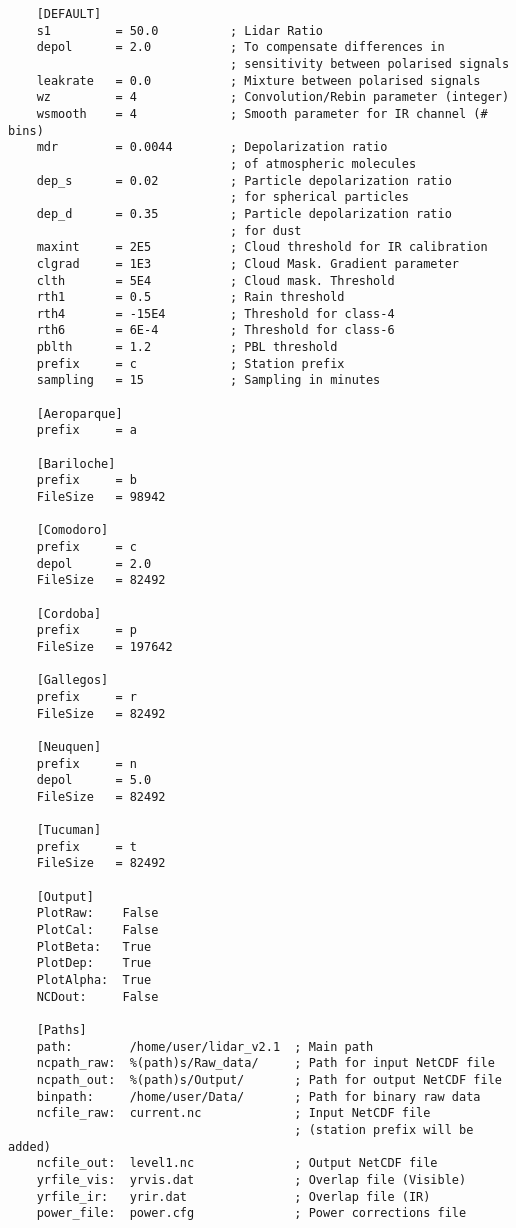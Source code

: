 \documentclass[12pt,a4paper,final]{report}
\begin{document}
    \begin{verbatim}
    [DEFAULT]
    s1         = 50.0          ; Lidar Ratio
    depol      = 2.0           ; To compensate differences in 
                               ; sensitivity between polarised signals
    leakrate   = 0.0           ; Mixture between polarised signals
    wz         = 4             ; Convolution/Rebin parameter (integer)
    wsmooth    = 4             ; Smooth parameter for IR channel (# bins)
    mdr        = 0.0044        ; Depolarization ratio 
                               ; of atmospheric molecules
    dep_s      = 0.02          ; Particle depolarization ratio 
                               ; for spherical particles
    dep_d      = 0.35          ; Particle depolarization ratio 
                               ; for dust
    maxint     = 2E5           ; Cloud threshold for IR calibration
    clgrad     = 1E3           ; Cloud Mask. Gradient parameter
    clth       = 5E4           ; Cloud mask. Threshold
    rth1       = 0.5           ; Rain threshold
    rth4       = -15E4         ; Threshold for class-4
    rth6       = 6E-4          ; Threshold for class-6
    pblth      = 1.2           ; PBL threshold
    prefix     = c             ; Station prefix
    sampling   = 15            ; Sampling in minutes
    
    [Aeroparque]
    prefix     = a
    
    [Bariloche]
    prefix     = b
    FileSize   = 98942
    
    [Comodoro]
    prefix     = c
    depol      = 2.0
    FileSize   = 82492
    
    [Cordoba]
    prefix     = p
    FileSize   = 197642
    
    [Gallegos]
    prefix     = r
    FileSize   = 82492
    
    [Neuquen]
    prefix     = n
    depol      = 5.0 
    FileSize   = 82492
    
    [Tucuman]
    prefix     = t
    FileSize   = 82492
    
    [Output]
    PlotRaw:    False
    PlotCal:    False
    PlotBeta:   True 
    PlotDep:    True
    PlotAlpha:  True 
    NCDout:     False
    
    [Paths]
    path:        /home/user/lidar_v2.1  ; Main path
    ncpath_raw:  %(path)s/Raw_data/     ; Path for input NetCDF file
    ncpath_out:  %(path)s/Output/       ; Path for output NetCDF file
    binpath:     /home/user/Data/       ; Path for binary raw data
    ncfile_raw:  current.nc             ; Input NetCDF file 
                                        ; (station prefix will be added)
    ncfile_out:  level1.nc              ; Output NetCDF file
    yrfile_vis:  yrvis.dat              ; Overlap file (Visible)
    yrfile_ir:   yrir.dat               ; Overlap file (IR)
    power_file:  power.cfg              ; Power corrections file
    \end{verbatim}
    
	
\end{document}
